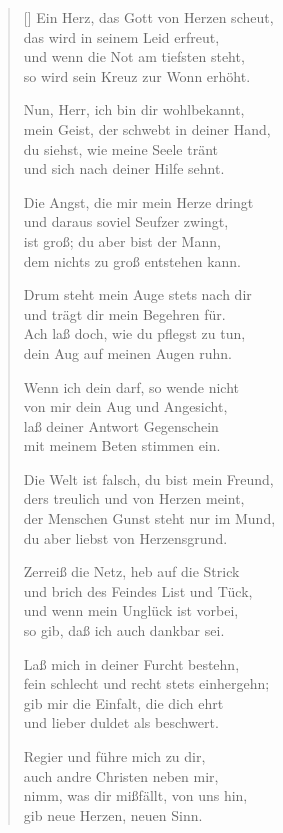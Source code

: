 \begin{multicols}{2}
\begin{verse}[\versewidth]
 Ein Herz, das Gott von Herzen scheut,\\
das wird in seinem Leid erfreut,\\
und wenn die Not am tiefsten steht,\\
so wird sein Kreuz zur Wonn erhöht.

 Nun, Herr, ich bin dir wohlbekannt,\\
mein Geist, der schwebt in deiner Hand,\\
du siehst, wie meine Seele tränt\\
und sich nach deiner Hilfe sehnt.

 Die Angst, die mir mein Herze dringt\\
und daraus soviel Seufzer zwingt,\\
ist groß; du aber bist der Mann,\\
dem nichts zu groß entstehen kann.

 Drum steht mein Auge stets nach dir\\
und trägt dir mein Begehren für.\\
Ach laß doch, wie du pflegst zu tun,\\
dein Aug auf meinen Augen ruhn.

 Wenn ich dein darf, so wende nicht\\
von mir dein Aug und Angesicht,\\
laß deiner Antwort Gegenschein\\
mit meinem Beten stimmen ein.

 Die Welt ist falsch, du bist mein Freund,\\
ders treulich und von Herzen meint,\\
der Menschen Gunst steht nur im Mund,\\
du aber liebst von Herzensgrund.

 Zerreiß die Netz, heb auf die Strick\\
und brich des Feindes List und Tück,\\
und wenn mein Unglück ist vorbei,\\
so gib, daß ich auch dankbar sei.

 Laß mich in deiner Furcht bestehn,\\
fein schlecht und recht stets einhergehn;\\
gib mir die Einfalt, die dich ehrt\\
und lieber duldet als beschwert.

 Regier und führe mich zu dir,\\
auch andre Christen neben mir,\\
nimm, was dir mißfällt, von uns hin,\\
gib neue Herzen, neuen Sinn.

\end{verse}
\end{multicols}

